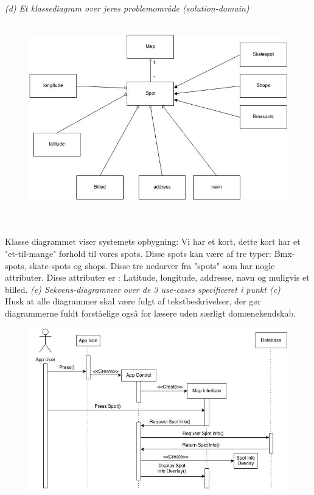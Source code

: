 \documentclass[12pt]{article}
\begin{document}
\textit{(d) Et klassediagram over jeres problemområde (solution-domain)}\\\\
\begin{figure}[h]
\includegraphics[scale = 0.5]{classdiagram}
\end{figure}\\\\
Klasse diagrammet viser systemets opbygning:
Vi har et kort, dette kort har et "et-til-mange" forhold til vores spots.
Disse spots kan være af tre typer: Bmx-spots, skate-spots og shops.
Disse tre nedarver fra "spots" som har nogle attributer. Disse attributer er : Latitude, longitude, addresse, navn og muligvis et billed.
\newpage
\textit{(e) Sekvens-diagrammer over de 3 use-cases specificeret i punkt (c)}\\
Husk at alle diagrammer skal være fulgt af tekstbeskrivelser, der gør diagrammerne fuldt
forståelige også for læsere uden særligt domænekendskab.\\
\begin{figure}[h]
\includegraphics[scale = 0.5]{sekdia1}
\end{figure}
\end{document}
